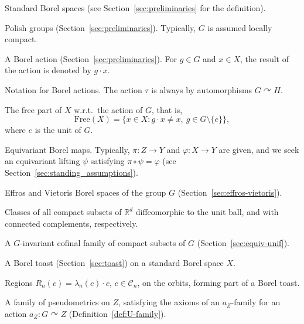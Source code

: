\documentclass[12pt]{paper}
\numberwithin{equation}{section}
\theoremstyle{plain}
\theoremstyle{definition}
\newcommand{\Rd}{\mathbb{R}^{d}}
\newcommand{\mfC}{\mathfrak{C}}
\newcommand{\mfD}{\mathfrak{D}}
\newcommand{\mfR}{\mathfrak{R}}
\newcommand{\effros}[1]{\mathcal{F}(#1)}
\newcommand{\vietoris}[2][]{\mathcal{K}_{#1}(#2)}
\newcommand{\unifm}{\mathsf{D}}
\newcommand{\acts}{\curvearrowright}
\newcommand{\free}{\mathrm{Free}}
\renewcommand{\phi}{\varphi}
\begin{document}
\begin{notation-list}
\item[\(X,Y,Z\)] Standard Borel spaces (see Section~\ref{sec:preliminaries} for the definition).

\item[\(G,H\)] Polish groups (Section~\ref{sec:preliminaries}).  Typically, \(G\) is assumed locally
  compact.

\item[\(G\acts X\) etc.] A Borel action (Section~\ref{sec:preliminaries}). For \(g\in G\) and \(x\in X\),
the result of the action is denoted by \( g\cdot x\).

\item[\(a_Z,a_X,\tau\)] Notation for Borel actions. The action \(\tau\) is always by automorphisms
  \(G\acts H\).

\item[\(\free (X)\)] The free part of \(X\) w.r.t.\ the action of \(G\), that is,
  \[ \free (X) =\{x\in X\colon g\cdot x \ne x,\ g\in G\setminus \{e\}\} ,\]
  where \(e\) is the unit of \(G\).

\item[\(\pi,\phi,\psi\)] Equivariant Borel maps.  Typically, \(\pi:Z\to Y\) and \(\phi:X\to Y\) are
  given, and we seek an equivariant lifting \(\psi\) satisfying \(\pi\circ\psi=\phi\) (see
  Section~\ref{sec:standing_assumptions}).

\item[\(\effros{G},\vietoris{G}\)] Effros and Vietoris Borel spaces of the group \(G\)
  (Section~\ref{sec:effros-vietoris}).

\item[\(\mfD_d,\mfC_d\)] Classes of all compact subsets of \(\Rd\) diffeomorphic to the unit ball,
  and with connected complements, respectively.

\item[\(\mfR\)] A \(G\)-invariant cofinal family of compact subsets of \(G\)
  (Section~\ref{sec:equiv-unif}).

\item[\((\mathcal{C}_n,\lambda_n)_n\)] A Borel toast (Section~\ref{sec:toast}) on a standard Borel
  space \(X\).

\item[\(R_n(c)\)] Regions \(R_n(c)=\lambda_n(c)\cdot c\), \(c\in\mathcal{C}_n\), on the orbits,
  forming part of a Borel toast.

\item[\(\unifm\)] A family of pseudometrics on \(Z\), satisfying the axioms of an \(a_Z\)-family
  for an action \(a_Z:G\acts Z\) (Definition~\ref{def:U-family}).


\end{notation-list}
\end{document}
